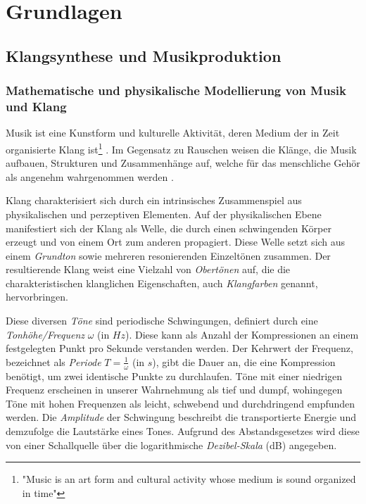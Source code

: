 \documentclass[
  a4paper,  %
  twoside,  %
  bibliography=totoc,
  headsepline,
  cleardoublepage=empty,
  parskip=half,
  draft=false
]{scrbook}
\begin{document}
\chapter{Grundlagen}

\section{Klangsynthese und Musikproduktion}

\subsection{Mathematische und physikalische Modellierung von Musik und Klang}\label{sec:music_math}
\glqq Musik ist eine Kunstform und kulturelle Aktivität, deren Medium der in Zeit organisierte Klang ist\grqq \footnote{"Music is an art form and cultural activity whose medium is sound organized in time"} \cite{tsuji_physics_2021}. Im Gegensatz zu Rauschen weisen die Klänge, die Musik aufbauen, Strukturen und Zusammenhänge auf, welche für das menschliche Gehör als angenehm wahrgenommen werden \cite{parker_good_2009}. 

Klang charakterisiert sich durch ein intrinsisches Zusammenspiel aus physikalischen und perzeptiven Elementen. Auf der physikalischen Ebene manifestiert sich der Klang als Welle, die durch einen schwingenden Körper erzeugt und von einem Ort zum anderen propagiert. Diese Welle setzt sich aus einem \emph{Grundton} sowie mehreren resonierenden Einzeltönen zusammen. Der resultierende Klang weist eine Vielzahl von \emph{Obertönen} auf, die die charakteristischen klanglichen Eigenschaften, auch \emph{Klangfarben} genannt, hervorbringen. \cite{tsuji_physics_2021, parker_good_2009}

Diese diversen \emph{Töne} sind periodische Schwingungen, definiert durch eine \emph{Tonhöhe/Frequenz} $\omega$ (in $Hz$). Diese kann als Anzahl der Kompressionen an einem festgelegten Punkt pro Sekunde verstanden werden. Der Kehrwert der Frequenz, bezeichnet als \emph{Periode} $T=\frac{1}{\omega}$ (in $s$), gibt die Dauer an, die eine Kompression benötigt, um zwei identische Punkte zu durchlaufen. Töne mit einer niedrigen Frequenz erscheinen in unserer Wahrnehmung als tief und dumpf, wohingegen Töne mit hohen Frequenzen als leicht, schwebend und durchdringend empfunden werden. Die \emph{Amplitude} der Schwingung beschreibt die transportierte Energie und demzufolge die Lautstärke eines Tones. Aufgrund des Abstandsgesetzes wird diese von einer Schallquelle über die logarithmische \emph{Dezibel-Skala} (dB) angegeben. \cite{tsuji_physics_2021, parker_good_2009}
\end{document}
